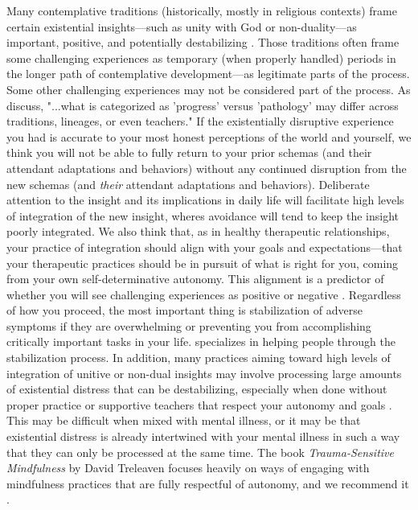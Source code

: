 \documentclass[12pt,letterpaper]{book}
\begin{document}
Many contemplative traditions (historically, mostly in religious contexts) frame certain existential insights—such as unity with God or non-duality—as important, positive, and potentially destabilizing \cite{ingram2018mastering}. Those traditions often frame some challenging experiences as temporary (when properly handled) periods in the longer path of contemplative development—as legitimate parts of the process. Some other challenging experiences may not be considered part of the process. As \textcite{lindahl2017varieties} discuss, "...what is categorized as 'progress' versus 'pathology' may differ across traditions, lineages, or even teachers." If the existentially disruptive experience you had is accurate to your most honest perceptions of the world and yourself, we think you will not be able to fully return  to your prior schemas (and their attendant adaptations and behaviors) without any continued disruption from the new schemas (and \textit{their} attendant adaptations and behaviors). Deliberate attention to the insight and its implications in daily life will facilitate high levels of integration of the new insight, wheres avoidance will tend to keep the insight poorly integrated. We also think that, as in healthy therapeutic relationships, your practice of integration should align with your goals and expectations—that your therapeutic practices should be in pursuit of what is right for you, coming from your own self-determinative autonomy. This alignment is a predictor of whether you will see challenging experiences as positive or negative \cite{lindahl2017varieties}. Regardless of how you proceed, the most important thing is stabilization of adverse symptoms if they are overwhelming or preventing you from accomplishing critically important tasks in your life. \textcite{cheetahHouse} specializes in helping people through the stabilization process. In addition, many practices aiming toward high levels of integration of unitive or non-dual insights may involve processing large amounts of existential distress \cite{ingram2018mastering} that can be destabilizing, especially when done without proper practice or supportive teachers that respect your autonomy and goals \cite{lindahl2017varieties}. This may be difficult when mixed with mental illness, or it may be that existential distress is already intertwined with your mental illness in such a way that they can only be processed at the same time. The book \textit{Trauma-Sensitive Mindfulness} by David Treleaven focuses heavily on ways of engaging with mindfulness practices that are fully respectful of autonomy, and we recommend it \cite{treleaven2018trauma}.
\end{document}
